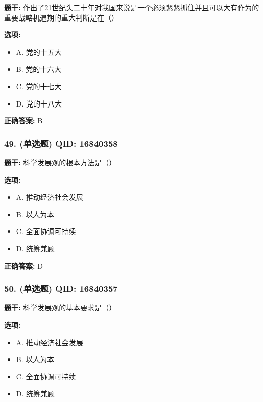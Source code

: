 \documentclass[12pt,UTF8]{ctexart}
\begin{document}
\textbf{题干:}
作出了21世纪头二十年对我国来说是一个必须紧紧抓住并且可以大有作为的重要战略机遇期的重大判断是在（）

\textbf{选项:}
\begin{itemize}[leftmargin=*]

  \item A. 党的十五大

  \item B. 党的十六大

  \item C. 党的十七大

  \item D. 党的十八大

\end{itemize}

\textbf{正确答案:}
B

\vspace{0.3em}\hrulefill\vspace{0.7em}

\subsubsection*{49. (单选题) \small QID: 16840358}

\textbf{题干:}
科学发展观的根本方法是（）

\textbf{选项:}
\begin{itemize}[leftmargin=*]

  \item A. 推动经济社会发展

  \item B. 以人为本

  \item C. 全面协调可持续

  \item D. 统筹兼顾

\end{itemize}

\textbf{正确答案:}
D

\vspace{0.3em}\hrulefill\vspace{0.7em}

\subsubsection*{50. (单选题) \small QID: 16840357}

\textbf{题干:}
科学发展观的基本要求是（）

\textbf{选项:}
\begin{itemize}[leftmargin=*]

  \item A. 推动经济社会发展

  \item B. 以人为本

  \item C. 全面协调可持续

  \item D. 统筹兼顾

\end{itemize}
\end{document}
